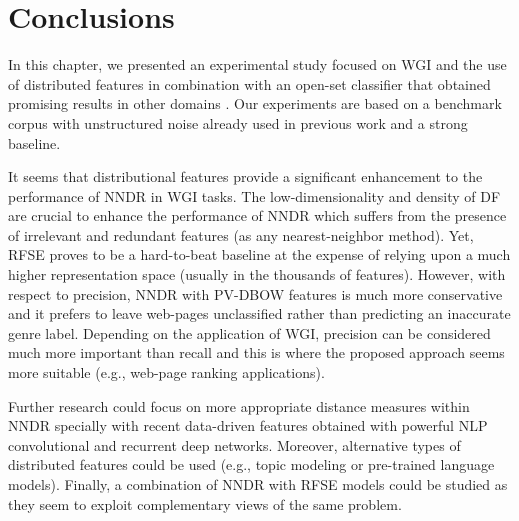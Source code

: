 \section{Conclusions}\label{chap:word_embeddings:sec:conclusions}

In this chapter, we presented an experimental study focused on WGI and the use of distributed features in combination with an open-set classifier that obtained promising results in other domains . Our experiments are based on a benchmark corpus with unstructured noise already used in previous work and a strong baseline. 

It seems that distributional features provide a significant enhancement to the performance of NNDR in WGI tasks. The low-dimensionality and density of DF are crucial to enhance the performance of NNDR which suffers from the presence of irrelevant and redundant features (as any nearest-neighbor method). Yet, RFSE proves to be a hard-to-beat baseline at the expense of relying upon a much higher representation space (usually in the thousands of features). However, with respect to precision, NNDR with PV-DBOW features is much more conservative and it prefers to leave web-pages unclassified rather than predicting an inaccurate genre label. Depending on the application of WGI, precision can be considered much more important than recall and this is where the proposed approach seems more suitable (e.g., web-page ranking applications).

Further research could focus on more appropriate distance measures within NNDR specially with recent data-driven features obtained with powerful NLP convolutional and recurrent deep networks. Moreover, alternative types of distributed features could be used (e.g., topic modeling or pre-trained language models). Finally, a combination of NNDR with RFSE models could be studied as they seem to exploit complementary views of the same problem.

